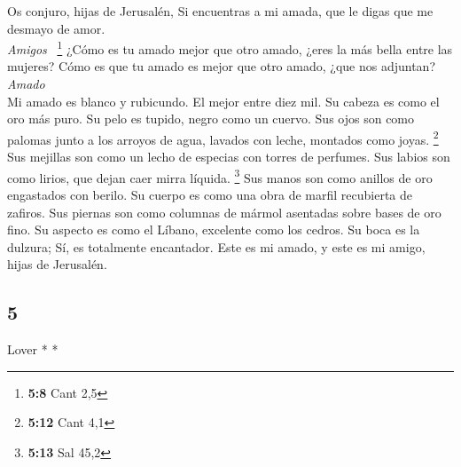\begin{paracol}{2}
 Os conjuro, hijas de Jerusalén, Si encuentras a mi amada,
que le digas que me desmayo de amor.\\
\emph{Amigos} ~\footnote{\textbf{5:8} Cant 2,5}  ¿Cómo es
tu amado mejor que otro amado, ¿eres la más bella entre las mujeres?
Cómo es que tu amado es mejor que otro amado, ¿que nos adjuntan?\\
\emph{Amado}\\
 Mi amado es blanco y rubicundo. El mejor entre diez mil.
 Su cabeza es como el oro más puro. Su pelo es tupido,
negro como un cuervo.  Sus ojos son como palomas junto a
los arroyos de agua, lavados con leche, montados como joyas. \footnote{\textbf{5:12}
  Cant 4,1}  Sus mejillas son como un lecho de especias
con torres de perfumes. Sus labios son como lirios, que dejan caer mirra
líquida. \footnote{\textbf{5:13} Sal 45,2}  Sus manos son
como anillos de oro engastados con berilo. Su cuerpo es como una obra de
marfil recubierta de zafiros.  Sus piernas son como
columnas de mármol asentadas sobre bases de oro fino. Su aspecto es como
el Líbano, excelente como los cedros.  Su boca es la
dulzura; Sí, es totalmente encantador. Este es mi amado, y este es mi
amigo, hijas de Jerusalén.

\switchcolumn
\begin{otherlanguage}{english}

\hypertarget{section-9}{%
\section{5}\label{section-9}}

\emph{\hfill\break
}Lover * *\\


\end{otherlanguage}
\end{paracol}
